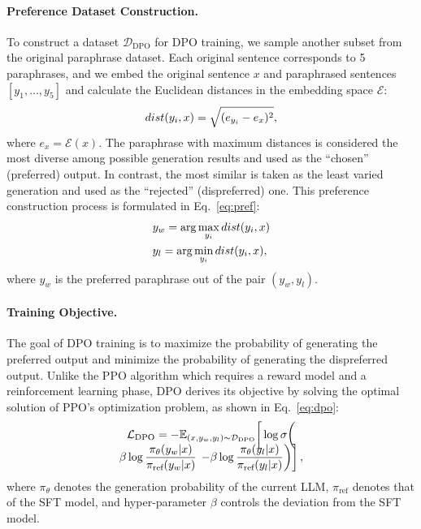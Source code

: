\paragraph{Preference Dataset Construction.}
To construct a dataset \(\mathcal{D}_{\text{DPO}}\) for DPO training, we sample another subset from the original paraphrase dataset. Each original sentence corresponds to 5 paraphrases, and we embed the original sentence \(x\) and paraphrased sentences \([y_1, ..., y_5]\) and calculate the Euclidean distances in the embedding space \(\mathcal{E}\):
\vspace{-0.25cm}
\begin{equation}
    dist(y_i, x) = \sqrt{(e_{y_i} - e_x)^2},
    \vspace{-0.25cm}
\label{eq:dist}
\end{equation}
where \(e_x = \mathcal{E}(x)\). The paraphrase with maximum distances is considered the most diverse among possible generation results and used as the ``chosen'' (preferred) output. In contrast, the most similar is taken as the least varied generation and used as the ``rejected'' (dispreferred) one. This preference construction process is formulated in Eq.~\ref{eq:pref}: 
\vspace{-0.25cm}
\begin{equation}
    \begin{aligned}
    &y_w= \arg \max_{y_i} dist(y_i,x) \\
    \vspace{-2mm}
    &y_l= \arg \min_{y_i} dist(y_i,x),
    \end{aligned}
\vspace{-0.3cm}
\label{eq:pref}
\end{equation}
where \(y_w\) is the preferred paraphrase out of the pair \((y_w, y_l)\).


\paragraph{Training Objective.}
The goal of DPO training is to maximize the probability of generating the preferred output and minimize the probability of generating the dispreferred output. Unlike the PPO algorithm which requires a reward model and a reinforcement learning phase, DPO derives its objective by solving the optimal solution of PPO's optimization problem, as shown in Eq.~\ref{eq:dpo}:
\vspace{-3mm}
\begin{multline}
    \vspace{-3mm}
    \mathcal{L}_\text{DPO} = 
    - \mathbb{E}_{(x, y_w, y_l) \sim \mathcal{D}_{\text{DPO}}}
     \bigg[ \log \sigma \bigg(
    \\
    \beta \log \frac{\pi_{\theta}(y_w | x)} 
    {\pi_{\text{ref}}(y_w | x)} 
    \left. \left. - \beta \log \frac{\pi_{\theta}(y_l | x)} 
    {\pi_{\text{ref}}(y_l | x)} 
     \right) \right],
\label{eq:dpo}
\end{multline}
where \(\pi_\theta\) denotes the generation probability of the current LLM, \(\pi_{\text{ref}}\) denotes that of the SFT model, and hyper-parameter \(\beta\) controls the deviation from the SFT model. 


